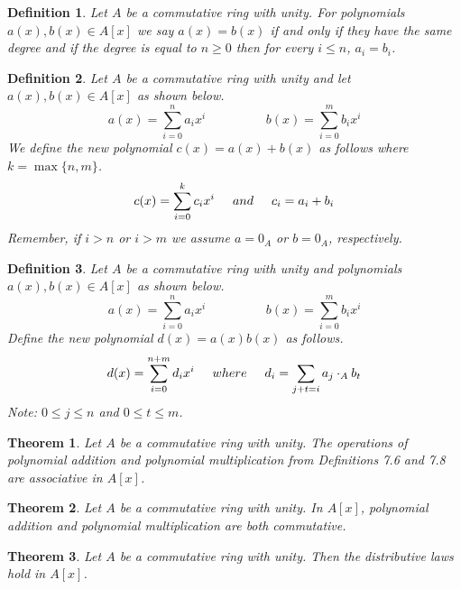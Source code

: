 \documentclass[letterpaper, 12pt]{article}
\newtheorem{defn}{Definition}
\newtheorem{thm}{Theorem}
\begin{document}
			\begin{defn}
			Let $A$ be a commutative ring with unity. 
			For polynomials $a(x), b(x) \in A[x]$ we say $a(x) = b(x)$ if and only if they have the same degree and if the degree is equal to $n \geq 0$ then for every $i \leq n$, $a_{i} = b_{i}$.
			\end{defn} 

			\begin{defn}
			Let $A$ be a commutative ring with unity and let $a(x), b(x) \in A[x]$ as shown below. $$a(x) = \sum\limits_{i=0}^{n}a_{i}x^{i} \hspace{2cm} b(x) = \sum\limits_{i=0}^{m}b_{i}x^{i}$$
			We define the new polynomial $c(x) = a(x) + b(x)$ as follows where $k = \max\{ n,m \}$. $$c(x) = \sum\limits_{i=0}^{k}c_{i}x^{i} \hspace{5mm} and \hspace{5mm} c_{i}=a_{i}+b_{i}$$
			Remember, if $i > n$ or $i > m$ we assume $a = 0_{A}$ or $b = 0_{A}$, respectively.
			\end{defn}

			\setcounter{defn}{7}
			\begin{defn}
			Let $A$ be a commutative ring with unity and polynomials $a(x), b(x) \in A[x]$ as shown below. $$a(x) = \sum\limits_{i=0}^{n}a_{i}x^{i} \hspace{2cm} b(x) = \sum\limits_{i=0}^{m}b_{i}x^{i}$$
			Define the new polynomial $d(x) = a(x)b(x)$ as follows. $$d(x) = \sum\limits_{i=0}^{n+m}d_{i}x^{i} \hspace{5mm} where \hspace{5mm} d_{i} = \sum\limits_{j+t=i} a_{j} \cdot_{A} b_{t}$$
			Note: $0 \leq j \leq n$ and $0 \leq t \leq m$.
			\end{defn}

			\setcounter{thm}{10}
			\begin{thm}
			Let $A$ be a commutative ring with unity. 
			The operations of polynomial addition and polynomial multiplication from Definitions 7.6 and 7.8 are associative in $A[x]$.
			\end{thm}

			\setcounter{thm}{12}
			\begin{thm}
			Let $A$ be a commutative ring with unity. 
			In $A[x]$, polynomial addition and polynomial multiplication are both commutative.
			\end{thm}

			\begin{thm}
			Let $A$ be a commutative ring with unity. 
			Then the distributive laws hold in $A[x]$.
			\end{thm}
\end{document}
